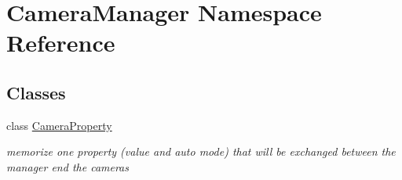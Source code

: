 \hypertarget{namespace_camera_manager}{}\section{Camera\+Manager Namespace Reference}
\label{namespace_camera_manager}
\subsection*{Classes}
\begin{DoxyCompactItemize}
\item 
class \mbox{\hyperlink{class_camera_manager_1_1_camera_property}{Camera\+Property}}
\begin{DoxyCompactList}\small\item\em memorize one property (value and auto mode) that will be exchanged between the manager end the cameras \end{DoxyCompactList}\end{DoxyCompactItemize}
